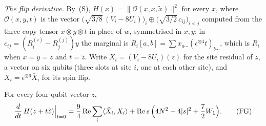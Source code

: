 \emph{The flip derivative.} By~(S), $H(x)=\|\mathcal O(x,x,\tilde x)\|^2$ for every $x$, where $\mathcal O(x,y,t)$ is the
vector $\bigl(\sqrt{3/8}\,(V_i-8U_i)\bigr)_i\oplus\bigl(\sqrt{3/2}\,c_{ij}\bigr)_{i<j}$ computed from the three-copy tensor
$x\otimes y\otimes t$ in place of $w$, symmetrised in $x,y$; in $c_{ij}=(R_i^{(i)}-R_j^{(j)})y$ the marginal is
$R_i[a,b]=\sum x_{a\cdots}(\epsilon^{\otimes4}t)_{b\cdots}$, which is $R_i$ when $x=y=z$ and $t=\tilde z$. Write
$X_i=(V_i-8U_i)(z)$ for the site residual of $z$, a vector on six qubits (three slots at site $i$, one at each other site), and
$\tilde X_i=\epsilon^{\otimes6}\bar X_i$ for its spin flip.

\begin{lemma}\label{lem:fqe-flip-gradient}
For every four-qubit vector $z$,
\[
 \frac{d}{dt}\,H(z+t\tilde z)\Big|_{t=0}=\frac94\operatorname{Re}\sum_i\langle\tilde X_i,X_i\rangle
 +\operatorname{Re}s\,\Bigl(4N^2-4|s|^2+\frac72W_1\Bigr).
 \tag{FG}\label{eq:fqe-flip-gradient}
\]
\end{lemma}

